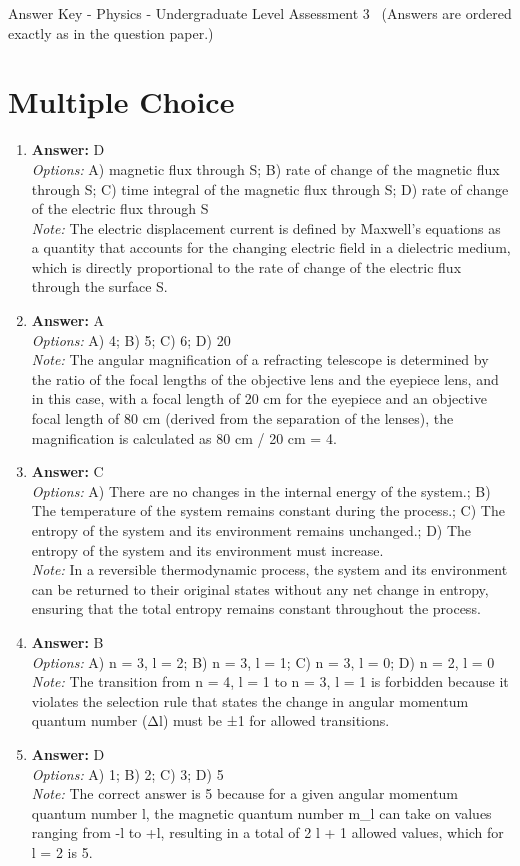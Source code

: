 \documentclass[12pt]{article}
\begin{document}
\begin{center}
Answer Key - Physics - Undergraduate Level Assessment 3 \
\small (Answers are ordered exactly as in the question paper.)
\end{center}

\section*{Multiple Choice}
\begin{enumerate}[label=\arabic*.]
\item \textbf{Answer:} D
\\ \textit{Options:} A) magnetic flux through S; B) rate of change of the magnetic flux through S; C) time integral of the magnetic flux through S; D) rate of change of the electric flux through S
\\ \textit{Note:} The electric displacement current is defined by Maxwell's equations as a quantity that accounts for the changing electric field in a dielectric medium, which is directly proportional to the rate of change of the electric flux through the surface S.
\item \textbf{Answer:} A
\\ \textit{Options:} A) 4; B) 5; C) 6; D) 20
\\ \textit{Note:} The angular magnification of a refracting telescope is determined by the ratio of the focal lengths of the objective lens and the eyepiece lens, and in this case, with a focal length of 20 cm for the eyepiece and an objective focal length of 80 cm (derived from the separation of the lenses), the magnification is calculated as 80 cm / 20 cm = 4.
\item \textbf{Answer:} C
\\ \textit{Options:} A) There are no changes in the internal energy of the system.; B) The temperature of the system remains constant during the process.; C) The entropy of the system and its environment remains unchanged.; D) The entropy of the system and its environment must increase.
\\ \textit{Note:} In a reversible thermodynamic process, the system and its environment can be returned to their original states without any net change in entropy, ensuring that the total entropy remains constant throughout the process.
\item \textbf{Answer:} B
\\ \textit{Options:} A) n = 3, l = 2; B) n = 3, l = 1; C) n = 3, l = 0; D) n = 2, l = 0
\\ \textit{Note:} The transition from n = 4, l = 1 to n = 3, l = 1 is forbidden because it violates the selection rule that states the change in angular momentum quantum number (Δl) must be ±1 for allowed transitions.
\item \textbf{Answer:} D
\\ \textit{Options:} A) 1; B) 2; C) 3; D) 5
\\ \textit{Note:} The correct answer is 5 because for a given angular momentum quantum number l, the magnetic quantum number m\_l can take on values ranging from -l to +l, resulting in a total of 2 l + 1 allowed values, which for l = 2 is 5.
\end{enumerate}
\end{document}
